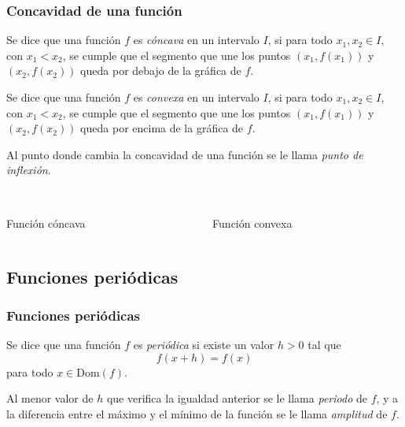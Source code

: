 \begin{frame}
\frametitle{Concavidad de una función}
\begin{definicion}
Se dice que una función $f$ es \emph{cóncava} en un intervalo $I$, si para todo $x_1,x_2\in I$, con $x_1<x_2$, se cumple que el segmento que une los puntos $(x_1,f(x_1))$ y $(x_2,f(x_2))$ queda por debajo de la gráfica de $f$.

Se dice que una función $f$ es \emph{convexa} en un intervalo $I$, si para todo $x_1,x_2\in I$, con $x_1<x_2$, se cumple que el segmento que une los puntos $(x_1,f(x_1))$ y $(x_2,f(x_2))$ queda por encima de la gráfica de $f$.

Al punto donde cambia la concavidad de una función se le llama \emph{punto de inflexión}.
\end{definicion}

\begin{columns}
\begin{column}{0.4\textwidth}
\begin{center}
\scalebox{1}{}\\
\color{red}Función cóncava
\end{center}
\end{column}
\begin{column}{0.4\textwidth}
\begin{center}
\scalebox{1}{}\\
\color{red}Función convexa
\end{center}
\end{column}
\end{columns}
\end{frame} 



\subsection{Funciones periódicas}
\begin{frame}
\frametitle{Funciones periódicas}
\begin{definicion}
Se dice que una función $f$ es \emph{periódica} si existe un valor $h>0$ tal que
\[f(x+h)=f(x)\]
para todo $x\in \textrm{Dom}(f)$.

Al menor valor de $h$ que verifica la igualdad anterior se le llama \emph{periodo} de $f$, y a la diferencia entre el máximo y el mínimo de la función se le llama \emph{amplitud} de $f$.
\end{definicion}

\begin{center}
\scalebox{1}{}
\end{center}
\end{frame} 



